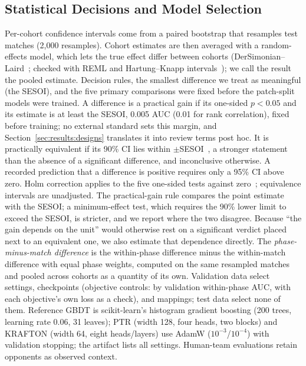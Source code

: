 \documentclass[sigconf,anonymous]{acmart}
\begin{document}
\subsection{Statistical Decisions and Model Selection}
Per-cohort confidence intervals come from a paired bootstrap that resamples test matches (2,000 resamples). Cohort estimates are then averaged with a random-effects model, which lets the true effect differ between cohorts (DerSimonian--Laird~\cite{DerSimonian86}; checked with REML and Hartung--Knapp intervals~\cite{HartungKnapp01}); we call the result the pooled estimate. Decision rules, the smallest difference we treat as meaningful (the SESOI), and the five primary comparisons were fixed before the patch-split models were trained. A difference is a practical gain if its one-sided $p<0.05$ and its estimate is at least the SESOI, 0.005 AUC (0.01 for rank correlation), fixed before training; no external standard sets this margin, and Section~\ref{sec:results:designs} translates it into review terms post hoc. It is practically equivalent if its 90\% CI lies within $\pm$SESOI~\cite{Schuirmann87}, a stronger statement than the absence of a significant difference, and inconclusive otherwise. A recorded prediction that a difference is positive requires only a 95\% CI above zero. Holm correction applies to the five one-sided tests against zero~\cite{Holm79}; equivalence intervals are unadjusted. The practical-gain rule compares the point estimate with the SESOI; a minimum-effect test, which requires the 90\% lower limit to exceed the SESOI, is stricter, and we report where the two disagree. Because ``the gain depends on the unit'' would otherwise rest on a significant verdict placed next to an equivalent one, we also estimate that dependence directly. The \emph{phase-minus-match difference} is the within-phase difference minus the within-match difference with equal phase weights, computed on the same resampled matches and pooled across cohorts as a quantity of its own. Validation data select settings, checkpoints (objective controls: by validation within-phase AUC, with each objective's own loss as a check), and mappings; test data select none of them. Reference GBDT is scikit-learn's histogram gradient boosting (200 trees, learning rate 0.06, 31 leaves); PTR (width 128, four heads, two blocks) and KRAFTON (width 64, eight heads/layers) use AdamW ($10^{-3}$/$10^{-4}$) with validation stopping; the artifact lists all settings. Human-team evaluations retain opponents as observed context.

\end{document}
